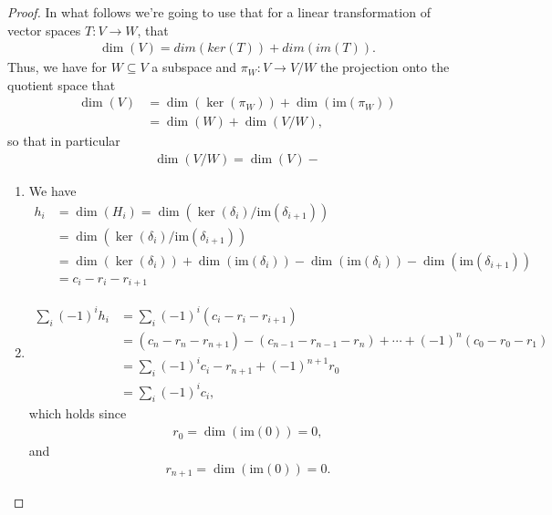 \documentclass[12pt]{extarticle}
\newcommand{\im}{\text{im}}
\newcommand{\<}{\langle}
\renewcommand{\>}{\rangle}
\theoremstyle{definition}
\begin{document}
\begin{proof}
  In what follows we're going to use that for a linear transformation of vector spaces $T:V \to W$, that 
  \begin{align*}
    \dim(V) = dim(ker(T)) + dim(im(T)).
  \end{align*}
  Thus, we have for $W \subseteq V$ a subspace and $\pi_W : V \to V/W$ the projection onto the quotient space that 
  \begin{align*}
    \dim(V)
    &= \dim(\ker(\pi_W)) + \dim(\im(\pi_W)) \\
    &= \dim(W) + \dim(V/W),
  \end{align*}
  so that in particular
  \begin{align*}
    \dim(V/W) = \dim(V) -
  \end{align*}
  
  

  
  \begin{enumerate}
  \item
    We have 
    \begin{align*}
      h_i
      &= \dim(H_i) = \dim (\ker(\delta_i)/\im(\delta_{i+1})) \\
      &= \dim (\ker(\delta_i)/\im(\delta_{i+1})) \\
      &= \dim (\ker(\delta_i)) + \dim(\im(\delta_i)) - \dim(\im(\delta_i)) - \dim(\im(\delta_{i+1}))  \\
      &=  c_i - r_i - r_{i+1}
    \end{align*}
  \item
    \begin{align*}
      \sum\limits_i (-1)^i h_i &= \sum\limits_i (-1)^i (c_i - r_i - r_{i+1})  \\
      &= (c_n - r_n - r_{n+1}) - (c_{n-1} - r_{n-1} - r_n) + \cdots + (-1)^n(c_0 - r_0 - r_1) \\
      &= \sum \limits_i (-1)^i c_i - r_{n+1} + (-1)^{n+1} r_0 \\
      &= \sum \limits_i (-1)^i c_i,
    \end{align*}
    which holds since
    \begin{align*}
      r_0 = \dim(\im(0)) = 0,
    \end{align*}
    and
    \begin{align*}
      r_{n+1} = \dim(\im(0)) = 0.
    \end{align*}
  \end{enumerate}
\end{proof}
\end{document}
